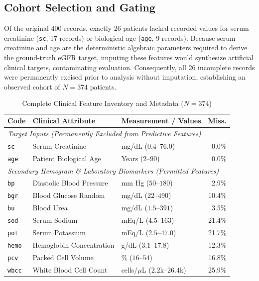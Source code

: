 \documentclass[10pt,conference]{IEEEtran}
\begin{document}
\subsection{Cohort Selection and Gating}
Of the original 400 records, exactly 26 patients lacked recorded values for serum creatinine (\texttt{sc}, 17 records) or biological age (\texttt{age}, 9 records). Because serum creatinine and age are the deterministic algebraic parameters required to derive the ground-truth eGFR target, imputing these features would synthesize artificial clinical targets, contaminating evaluation. Consequently, all 26 incomplete records were permanently excised prior to analysis without imputation, establishing an observed cohort of $N = 374$ patients.

\begin{table}[htbp]
\centering
\caption{Complete Clinical Feature Inventory and Metadata ($N = 374$)}
\label{tab:feature_inventory}
\renewcommand{\arraystretch}{0.84}
\scriptsize
\begin{tabularx}{\columnwidth}{llp{2.3cm}r}
\toprule
\textbf{Code} & \textbf{Clinical Attribute} & \textbf{Measurement / Values} & \textbf{Miss.} \\
\midrule
\multicolumn{4}{l}{\textit{Target Inputs (Permanently Excluded from Predictive Features)}} \\
\texttt{sc} & Serum Creatinine & mg/dL ($0.4$--$76.0$) & 0.0\% \\
\texttt{age} & Patient Biological Age & Years ($2$--$90$) & 0.0\% \\
\midrule
\multicolumn{4}{l}{\textit{Secondary Hemogram \& Laboratory Biomarkers (Permitted Features)}} \\
\texttt{bp} & Diastolic Blood Pressure & mm Hg ($50$--$180$) & 2.9\% \\
\texttt{bgr} & Blood Glucose Random & mg/dL ($22$--$490$) & 10.4\% \\
\texttt{bu} & Blood Urea & mg/dL ($1.5$--$391$) & 3.5\% \\
\texttt{sod} & Serum Sodium & mEq/L ($4.5$--$163$) & 21.4\% \\
\texttt{pot} & Serum Potassium & mEq/L ($2.5$--$47.0$) & 21.7\% \\
\texttt{hemo} & Hemoglobin Concentration & g/dL ($3.1$--$17.8$) & 12.3\% \\
\texttt{pcv} & Packed Cell Volume & \% ($16$--$54$) & 16.8\% \\
\texttt{wbcc} & White Blood Cell Count & cells/$\mu$L ($2.2\text{k}$--$26.4\text{k}$) & 25.9\% \\

\end{tabularx}
\end{table}
\end{document}
